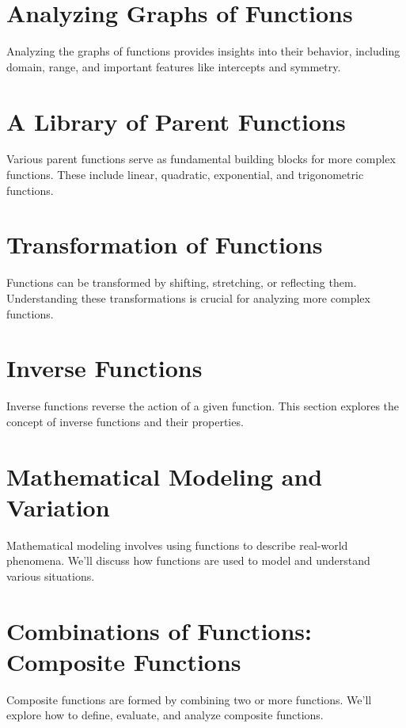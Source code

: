 \documentclass{article}
\begin{document}
\section{Analyzing Graphs of Functions}

Analyzing the graphs of functions provides insights into their behavior, including domain, range, and important features like intercepts and symmetry.

\section{A Library of Parent Functions}

Various parent functions serve as fundamental building blocks for more complex functions. These include linear, quadratic, exponential, and trigonometric functions.

\section{Transformation of Functions}

Functions can be transformed by shifting, stretching, or reflecting them. Understanding these transformations is crucial for analyzing more complex functions.

\section{Inverse Functions}

Inverse functions reverse the action of a given function. This section explores the concept of inverse functions and their properties.

\section{Mathematical Modeling and Variation}

Mathematical modeling involves using functions to describe real-world phenomena. We'll discuss how functions are used to model and understand various situations.

\section{Combinations of Functions: Composite Functions}

Composite functions are formed by combining two or more functions. We'll explore how to define, evaluate, and analyze composite functions.
\end{document}
